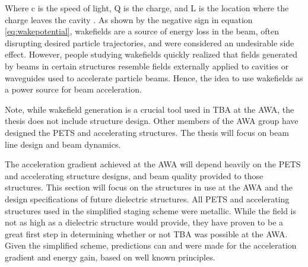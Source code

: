 Where c is the speed of light, Q is the charge, 
and L is the location where the charge leaves the cavity \cite{SLACwakefields}.
As shown by the negative sign in equation \ref{eq:wakepotential}, wakefields are a source of 
energy loss in the beam, often disrupting desired particle trajectories, 
and were considered an undesirable side effect.
However, people studying wakefields quickly realized that fields
generated by beams in certain structures resemble fields externally 
applied to cavities or waveguides used to accelerate particle beams.
Hence, the idea to use wakefields as a power source for beam acceleration. 

Note, while wakefield generation is a crucial tool used in TBA at the AWA, the thesis does not include 
structure design. Other members of the AWA group have designed the PETS and accelerating
structures. The thesis will focus on beam line design and beam dynamics. 



The acceleration gradient achieved at the AWA will depend heavily 
on the PETS and accelerating structure designs, and beam quality 
provided to those structures. This section will focus on the 
structures in use at the AWA and the design specifications of future 
dielectric structures. All PETS and accelerating structures 
used in the simplified staging scheme were metallic. 
While the field is not as high as a dielectric structure would provide,
they have proven to be a great first step 
in determining whether or not TBA was possible at the AWA. Given 
the simplified scheme, predictions can and were made for the acceleration 
gradient and energy gain, based on well known principles. 

